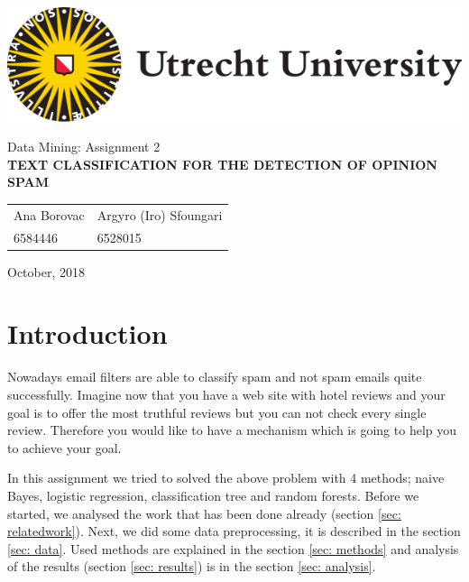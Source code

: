 \documentclass[a4paper,11pt]{article}
\begin{document}
\thispagestyle{empty}

\includegraphics[scale=0.35]{UUlogo.png}

\vspace{50mm}

\begin{center}
\begin{large}
Data Mining: Assignment 2 \\[3mm]
\textbf{
\uppercase{Text Classification for the Detection of Opinion Spam}} \\[25mm]
\end{large}

\begin{tabularx}{\textwidth}{YY}
Ana Borovac & Argyro (Iro) Sfoungari \\
6584446 & 6528015
\end{tabularx}
\end{center}

\vfill

October, 2018

\newpage

\tableofcontents

\vspace{3cm}

\begin{abstract}
\end{abstract}

\newpage

\section{Introduction}
Nowadays email filters are able to classify spam and not spam emails quite successfully. Imagine now that you have a web site with hotel reviews and your goal is to offer the most truthful reviews but you can not check every single review. Therefore you would like to have a mechanism which is going to help you to achieve your goal. 

In this assignment we tried to solved the above problem with 4 methods; naive Bayes, logistic regression, classification tree and random forests. Before we started, we analysed the work that has been done already (section \ref{sec: relatedwork}). Next, we did some data preprocessing, it is described in the section \ref{sec: data}. Used methods are explained in the section \ref{sec: methods} and analysis of the results (section \ref{sec: results}) is in the section \ref{sec: analysis}.
\end{document}
